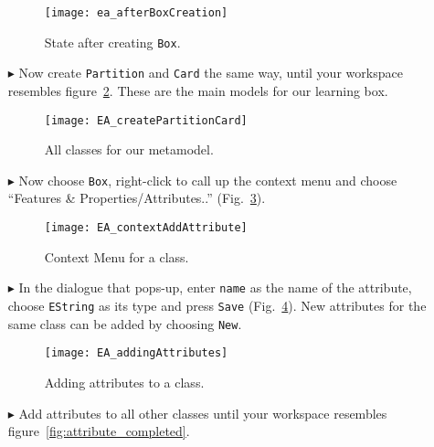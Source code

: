 \begin{itemize}
\begin{figure}[htbp]
	\centering
  \texttt{[image: ea\_afterBoxCreation]}
	\caption{State after creating \texttt{Box}.}
	\label{fig:eclass_completed}
\end{figure}

\vfill
\pagebreak


\item[$\blacktriangleright$] Now create \texttt{Partition} and \texttt{Card} the same way, until your workspace resembles figure~\ref{fig:all_eclasses}.
These are the main models for our learning box.

\vspace{1cm}

\begin{figure}[htbp]
	\centering
  \texttt{[image: EA\_createPartitionCard]}
	\caption{All classes for our metamodel.}
	\label{fig:all_eclasses}
\end{figure}

\vspace{1cm}

\item[$\blacktriangleright$] Now choose \texttt{Box}, right-click to call up the context menu and choose ``Features \& Properties/Attributes..'' (Fig.~\ref{fig:attribute}).

\begin{figure}[htbp]
	\centering
  \texttt{[image: EA\_contextAddAttribute]}
	\caption{Context Menu for a class.}
	\label{fig:attribute}
\end{figure}
\FloatBarrier

\vspace{0.5cm}

\item[$\blacktriangleright$] In the dialogue that pops-up, enter \texttt{name} as the name of the attribute, choose \texttt{EString} as its type and press \texttt{Save} (Fig.~\ref{fig:attribute_properties}). New attributes for the same class can be added by choosing \texttt{New}.

\vspace{0.5cm}

\begin{figure}[htbp]
	\centering
  \texttt{[image: EA\_addingAttributes]}
	\caption{Adding attributes to a class.}
	\label{fig:attribute_properties}
\end{figure}


\item[$\blacktriangleright$] Add attributes to all other classes until your workspace resembles figure~\ref{fig:attribute_completed}.


\end{itemize}
